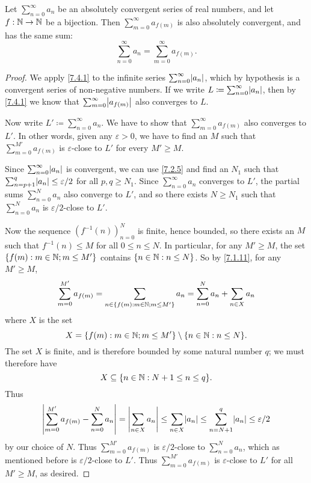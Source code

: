 \setcounter{thm}{2}
\begin{prop}\label{7.4.3}
  Let \(\sum_{n = 0}^\infty a_n\) be an absolutely convergent series of real numbers, and let \(f : \mathbb{N} \to \mathbb{N}\) be a bijection.
  Then \(\sum_{m = 0}^\infty a_{f(m)}\) is also absolutely convergent, and has the same sum:
  \[
    \sum_{n = 0}^\infty a_n = \sum_{m = 0}^\infty a_{f(m)}.
  \]
\end{prop}

\begin{proof}
  We apply \cref{7.4.1} to the infinite series \(\sum_{n = 0}^\infty \abs{a_n}\), which by hypothesis is a convergent series of non-negative numbers.
  If we write \(L \coloneqq \sum_{n = 0}^\infty \abs{a_n}\), then by \cref{7.4.1} we know that \(\sum_{m = 0}^\infty \abs{a_{f(m)}}\) also converges to \(L\).

  Now write \(L' \coloneqq \sum_{n = 0}^\infty a_n\).
  We have to show that \(\sum_{m = 0}^\infty a_{f(m)}\) also converges to \(L'\).
  In other words, given any \(\varepsilon > 0\), we have to find an \(M\) such that \(\sum_{m = 0}^{M'} a_{f(m)}\) is \(\varepsilon\)-close to \(L'\) for every \(M' \geq M\).

  Since \(\sum_{n = 0}^\infty \abs{a_n}\) is convergent, we can use \cref{7.2.5} and find an \(N_1\) such that \(\sum_{n = p + 1}^q \abs{a_n} \leq \varepsilon / 2\) for all \(p, q \geq N_1\).
  Since \(\sum_{n = 0}^\infty a_n\) converges to \(L'\), the partial sums \(\sum_{n = 0}^N a_n\) also converge to \(L'\), and so there exists \(N \geq N_1\) such that \(\sum_{n = 0}^N a_n\) is \(\varepsilon / 2\)-close to \(L'\).

  Now the sequence \((f^{-1}(n))_{n = 0}^N\) is finite, hence bounded, so there exists an \(M\) such that \(f^{-1}(n) \leq M\) for all \(0 \leq n \leq N\).
  In particular, for any \(M' \geq M\), the set \(\{f(m) : m \in \mathbb{N}; m \leq M'\}\) contains \(\{n \in \mathbb{N} : n \leq N\}\).
  So by \cref{7.1.11}, for any \(M' \geq M\),
  \[
    \sum_{m = 0}^{M'} a_{f(m)} = \sum_{n \in \{f(m) : m \in \mathbb{N}; m \leq M'\}} a_n = \sum_{n = 0}^N a_n + \sum_{n \in X} a_n
  \]
  where \(X\) is the set
  \[
    X = \{f(m) : m \in \mathbb{N}; m \leq M'\} \setminus \{n \in \mathbb{N} : n \leq N\}.
  \]
  The set \(X\) is finite, and is therefore bounded by some natural number \(q\);
  we must therefore have
  \[
    X \subseteq \{n \in \mathbb{N} : N + 1 \leq n \leq q\}.
  \]
  Thus
  \[
    \abs{\sum_{m = 0}^{M'} a_{f(m)} - \sum_{n = 0}^N a_n} = \abs{\sum_{n \in X} a_n} \leq \sum_{n \in X} \abs{a_n} \leq \sum_{n = N + 1}^q \abs{a_n} \leq \varepsilon / 2
  \]
  by our choice of \(N\).
  Thus \(\sum_{m = 0}^{M'} a_{f(m)}\) is \(\varepsilon / 2\)-close to \(\sum_{n = 0}^N a_n\), which as mentioned before is \(\varepsilon / 2\)-close to \(L'\).
  Thus \(\sum_{m = 0}^{M'} a_{f(m)}\) is \(\varepsilon\)-close to \(L'\) for all \(M' \geq M\), as desired.
\end{proof}

